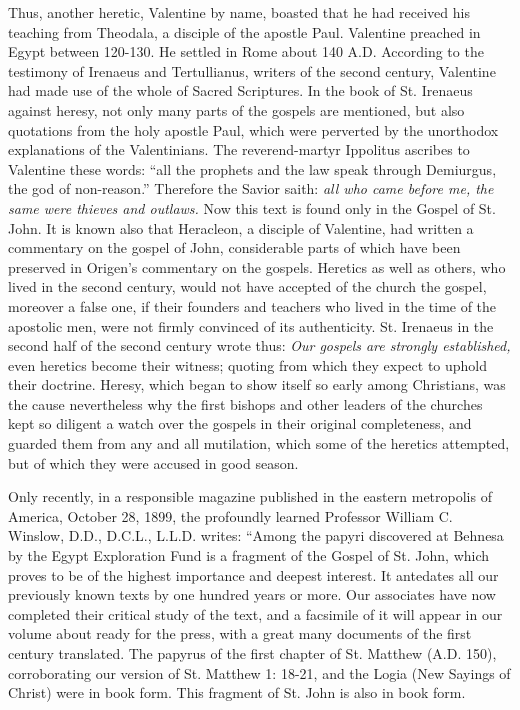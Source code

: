 Thus, another heretic, Valentine by name, boasted that he had received his teaching from Theodala, a disciple of the apostle Paul. Valentine preached in Egypt between 120-130. He settled in Rome about 140 A.D. According to the testimony of Irenaeus and Tertullianus, writers of the second century, Valentine had made use of the whole of Sacred Scriptures. In the book of St. Irenaeus against heresy, not only many parts of the gospels are mentioned, but also quotations from the holy apostle Paul, which were perverted by the unorthodox explanations of the Valentinians. The reverend-martyr Ippolitus ascribes to Valentine these words: ``all the prophets and the law speak through Demiurgus, the god of non-reason.'' Therefore the Savior saith: \textit{all who came before me, the same were thieves and outlaws.} Now this text is found only in the Gospel of St. John. It is known also that Heracleon, a disciple of Valentine, had written a commentary on the gospel of John, considerable parts of which have been preserved in Origen's commentary on the gospels. Heretics as well as others, who lived in the second century, would not have accepted of the church the gospel, moreover a false one, if their founders and teachers who lived in the time of the apostolic men, were not firmly convinced of its authenticity. St. Irenaeus in the second half of the second century wrote thus: \textit{Our gospels are strongly established,} even heretics become their witness; quoting from which they expect to uphold their doctrine. Heresy, which began to show itself so early among Christians, was the cause nevertheless why the first bishops and other leaders of the churches kept so diligent a watch over the gospels in their original completeness, and guarded them from any and all mutilation, which some of the heretics attempted, but of which they were accused in good season.

Only recently, in a responsible magazine published in the eastern metropolis of America, October 28, 1899, the profoundly learned Professor William C. Winslow, D.D., D.C.L., L.L.D. writes: ``Among the papyri discovered at Behnesa by the Egypt Exploration Fund is a fragment of the Gospel of St. John, which proves to be of the highest importance and deepest interest. It antedates all our previously known texts by one hundred years or more. Our associates have now completed their critical study of the text, and a facsimile of it will appear in our volume about ready for the press, with a great many documents of the first century translated. The papyrus of the first chapter of St. Matthew (A.D. 150), corroborating our version of St. Matthew 1: 18-21, and the Logia (New Sayings of Christ) were in book form. This fragment of St. John is also in book form.


